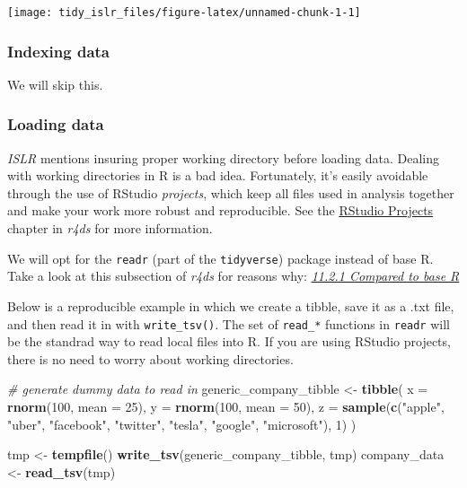 \documentclass[]{book}
\newenvironment{Shaded}{\begin{snugshade}}{\end{snugshade}}
\newcommand{\CommentTok}[1]{\textcolor[rgb]{0.56,0.35,0.01}{\textit{#1}}}
\newcommand{\DataTypeTok}[1]{\textcolor[rgb]{0.13,0.29,0.53}{#1}}
\newcommand{\DecValTok}[1]{\textcolor[rgb]{0.00,0.00,0.81}{#1}}
\newcommand{\KeywordTok}[1]{\textcolor[rgb]{0.13,0.29,0.53}{\textbf{#1}}}
\newcommand{\NormalTok}[1]{#1}
\newcommand{\StringTok}[1]{\textcolor[rgb]{0.31,0.60,0.02}{#1}}
\begin{document}
\begin{center}\texttt{[image: tidy\_islr\_files/figure-latex/unnamed-chunk-1-1]} \end{center}

\hypertarget{indexing-data}{%
\subsubsection{Indexing data}\label{indexing-data}}

We will skip this.

\hypertarget{loading-data}{%
\subsubsection{Loading data}\label{loading-data}}

\emph{ISLR} mentions insuring proper working directory before loading data. Dealing with working directories in R is a bad idea. Fortunately, it's easily avoidable through the use of RStudio \emph{projects}, which keep all files used in analysis together and make your work more robust and reproducible. See the \href{http://r4ds.had.co.nz/workflow-projects.html}{RStudio Projects} chapter in \emph{r4ds} for more information.

We will opt for the \texttt{readr} (part of the \texttt{tidyverse}) package instead of base R. Take a look at this subsection of \emph{r4ds} for reasons why:
\href{http://r4ds.had.co.nz/data-import.html}{\emph{11.2.1 Compared to base R}}

Below is a reproducible example in which we create a tibble, save it as a .txt file, and then read it in with \texttt{write\_tsv()}. The set of \texttt{read\_*} functions in \texttt{readr} will be the standrad way to read local files into R. If you are using RStudio projects, there is no need to worry about working directories.

\begin{Shaded}
\begin{Highlighting}[]
\CommentTok{# generate dummy data to read in}
\NormalTok{generic_company_tibble <-}\StringTok{ }\KeywordTok{tibble}\NormalTok{(}
  \DataTypeTok{x =} \KeywordTok{rnorm}\NormalTok{(}\DecValTok{100}\NormalTok{, }\DataTypeTok{mean =} \DecValTok{25}\NormalTok{),}
  \DataTypeTok{y =} \KeywordTok{rnorm}\NormalTok{(}\DecValTok{100}\NormalTok{, }\DataTypeTok{mean =} \DecValTok{50}\NormalTok{),}
  \DataTypeTok{z =} \KeywordTok{sample}\NormalTok{(}\KeywordTok{c}\NormalTok{(}\StringTok{"apple"}\NormalTok{, }\StringTok{"uber"}\NormalTok{, }\StringTok{"facebook"}\NormalTok{, }\StringTok{"twitter"}\NormalTok{, }\StringTok{"tesla"}\NormalTok{, }\StringTok{"google"}\NormalTok{, }\StringTok{"microsoft"}\NormalTok{), }\DecValTok{1}\NormalTok{)}
\NormalTok{)}

\NormalTok{tmp <-}\StringTok{ }\KeywordTok{tempfile}\NormalTok{()}
\KeywordTok{write_tsv}\NormalTok{(generic_company_tibble, tmp)}
\NormalTok{company_data <-}\StringTok{ }\KeywordTok{read_tsv}\NormalTok{(tmp)}
\end{Highlighting}
\end{Shaded}
\end{document}
